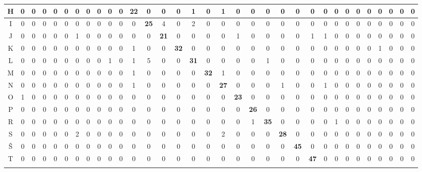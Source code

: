 \begin{table}[]
{\begin{tabular}{|c|c|c|c|c|c|c|c|c|c|c|c|c|c|c|c|c|c|c|c|c|c|c|c|c|c|c|c|c|c|c|c|c|}
H & 0 & 0 & 0 & 0 & 0 & 0 & 0 & 0 & 0 & 0 & \textbf{22} & 0 & 0 & 0 & 1 & 0 & 1 & 0 & 0 & 0 & 0 & 0 & 0 & 0 & 0 & 0 & 0 & 0 & 0 & 0 & 0 & 0 \\ \hline \rowcolor{gray2} 
I & 0 & 0 & 0 & 0 & 0 & 0 & 0 & 0 & 0 & 0 & 0 & \textbf{25} & 4 & 0 & 2 & 0 & 0 & 0 & 0 & 0 & 0 & 0 & 0 & 0 & 0 & 0 & 0 & 0 & 0 & 0 & 0 & 0 \\ \hline \rowcolor{gray1}
J & 0 & 0 & 0 & 0 & 0 & 1 & 0 & 0 & 0 & 0 & 0 & 0 & \textbf{21} & 0 & 0 & 0 & 0 & 1 & 0 & 0 & 0 & 0 & 1 & 1 & 0 & 0 & 0 & 0 & 0 & 0 & 0 & 0 \\ \hline \rowcolor{gray2} 
K & 0 & 0 & 0 & 0 & 0 & 0 & 0 & 0 & 0 & 0 & 1 & 0 & 0 & \textbf{32} & 0 & 0 & 0 & 0 & 0 & 0 & 0 & 0 & 0 & 0 & 0 & 0 & 0 & 0 & 1 & 0 & 0 & 0 \\ \hline \rowcolor{gray1}
L & 0 & 0 & 0 & 0 & 0 & 0 & 0 & 0 & 1 & 0 & 1 & 5 & 0 & 0 & \textbf{31} & 0 & 0 & 0 & 0 & 1 & 0 & 0 & 0 & 0 & 0 & 0 & 0 & 0 & 0 & 0 & 0 & 0 \\ \hline \rowcolor{gray2} 
M & 0 & 0 & 0 & 0 & 0 & 0 & 0 & 0 & 0 & 0 & 1 & 0 & 0 & 0 & 0 & \textbf{32} & 1 & 0 & 0 & 0 & 0 & 0 & 0 & 0 & 0 & 0 & 0 & 0 & 0 & 0 & 0 & 0 \\ \hline \rowcolor{gray1}
N & 0 & 0 & 0 & 0 & 0 & 0 & 0 & 0 & 0 & 0 & 1 & 0 & 0 & 0 & 0 & 0 & \textbf{27} & 0 & 0 & 0 & 1 & 0 & 0 & 1 & 0 & 0 & 0 & 0 & 0 & 0 & 0 & 0 \\ \hline \rowcolor{gray2} 
O & 1 & 0 & 0 & 0 & 0 & 0 & 0 & 0 & 0 & 0 & 0 & 0 & 0 & 0 & 0 & 0 & 0 & \textbf{23} & 0 & 0 & 0 & 0 & 0 & 0 & 0 & 0 & 0 & 0 & 0 & 0 & 0 & 0 \\ \hline \rowcolor{gray1}
P & 0 & 0 & 0 & 0 & 0 & 0 & 0 & 0 & 0 & 0 & 0 & 0 & 0 & 0 & 0 & 0 & 0 & 0 & \textbf{26} & 0 & 0 & 0 & 0 & 0 & 0 & 0 & 0 & 0 & 0 & 0 & 0 & 0 \\ \hline \rowcolor{gray2} 
R & 0 & 0 & 0 & 0 & 0 & 0 & 0 & 0 & 0 & 0 & 0 & 0 & 0 & 0 & 0 & 0 & 0 & 0 & 1 & \textbf{35} & 0 & 0 & 0 & 0 & 1 & 0 & 0 & 0 & 0 & 0 & 0 & 0 \\ \hline \rowcolor{gray1}
S & 0 & 0 & 0 & 0 & 0 & 2 & 0 & 0 & 0 & 0 & 0 & 0 & 0 & 0 & 0 & 0 & 2 & 0 & 0 & 0 & \textbf{28} & 0 & 0 & 0 & 0 & 0 & 0 & 0 & 0 & 0 & 0 & 0 \\ \hline \rowcolor{gray2} 
Š & 0 & 0 & 0 & 0 & 0 & 0 & 0 & 0 & 0 & 0 & 0 & 0 & 0 & 0 & 0 & 0 & 0 & 0 & 0 & 0 & 0 & \textbf{45} & 0 & 0 & 0 & 0 & 0 & 0 & 0 & 0 & 0 & 0 \\ \hline \rowcolor{gray1}
T & 0 & 0 & 0 & 0 & 0 & 0 & 0 & 0 & 0 & 0 & 0 & 0 & 0 & 0 & 0 & 0 & 0 & 0 & 0 & 0 & 0 & 0 & \textbf{47} & 0 & 0 & 0 & 0 & 0 & 0 & 0 & 0 & 0 \\ \hline \rowcolor{gray2} 

\end{tabular}}
\end{table}
